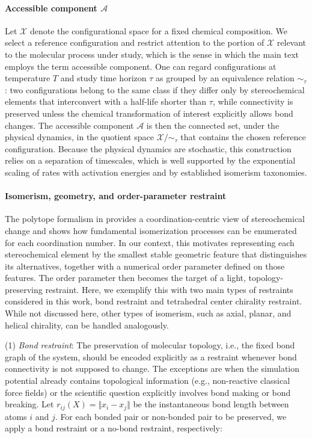 \documentclass[]{fairmeta}
\theoremstyle{remark}
\begin{document}
\paragraph{Accessible component $\mathcal{A}$}
Let $\mathcal{X}$ denote the configurational space for a fixed chemical composition. We select a reference configuration and restrict attention to the portion of $\mathcal{X}$ relevant to the molecular process under study, which is the sense in which the main text employs the term accessible component.
One can regard configurations at temperature $T$ and study time horizon $\tau$ as grouped by an equivalence relation $\sim_\tau$: two configurations belong to the same class if they differ only by stereochemical elements that interconvert with a half-life shorter than $\tau$, while connectivity is preserved unless the chemical transformation of interest explicitly allows bond changes.
The accessible component $\mathcal{A}$ is then the connected set, under the physical dynamics, in the quotient space $\mathcal{X}/\sim_\tau$ that contains the chosen reference configuration.
Because the physical dynamics are stochastic, this construction relies on a separation of timescales, which is well supported by the exponential scaling of rates with activation energies and by established isomerism taxonomies.

\paragraph{Isomerism, geometry, and order-parameter restraint}
The polytope formalism in \citet{canfield2018new} provides a coordination-centric view of stereochemical change and shows how fundamental isomerization processes can be enumerated for each coordination number.
In our context, this motivates representing each stereochemical element by the smallest stable geometric feature that distinguishes its alternatives, together with a numerical order parameter defined on those features.
The order parameter then becomes the target of a light, topology-preserving restraint.
Here, we exemplify this with two main types of restraints considered in this work, bond restraint and tetrahedral center chirality restraint.
While not discussed here, other types of isomerism, such as axial, planar, and helical chirality, can be handled analogously.

(1) \textit{Bond restraint}: The preservation of molecular topology, i.e., the fixed bond graph of the system, should be encoded explicitly as a restraint whenever bond connectivity is not supposed to change.
The exceptions are when the simulation potential already contains topological information (e.g., non-reactive classical force fields) or the scientific question explicitly involves bond making or bond breaking.
Let $r_{ij}(X) = \Vert x_i - x_j \Vert$ be the instantaneous bond length between atoms $i$ and $j$.
For each bonded pair or non-bonded pair to be preserved, we apply a bond restraint or a no-bond restraint, respectively:
\end{document}
